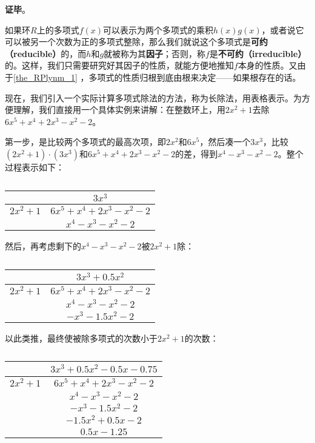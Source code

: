 \textbf{证毕}。

如果环$R$上的多项式$f(x)$可以表示为两个多项式的乘积$h(x)g(x)$，或者说它可以被另一个次数为正的多项式整除，那么我们就说这个多项式是\textbf{可约（reducible）}的，而$h$和$g$就被称为其\textbf{因子}；否则，称$f$是\textbf{不可约（irreducible）}的。这样，我们只需要研究好其因子的性质，就能方便地推知$f$本身的性质。又由于\autoref{the_RPlynm_1} ，多项式的性质归根到底由根来决定——如果根存在的话。

现在，我们引入一个实际计算多项式除法的方法，称为长除法，用表格表示。为方便理解，我们直接用一个具体实例来讲解：在整数环上，用$2x^2+1$去除$6x^5+x^4+2x^3-x^2-2$。

第一步，是比较两个多项式的最高次项，即$2x^2$和$6x^5$，然后凑一个$3x^3$，比较$(2x^2+1)\cdot(3x^3)$和$6x^5+x^4+2x^3-x^2-2$的差，得到$x^4-x^3-x^2-2$。整个过程表示如下：

\begin{table}[ht]
\centering
\caption{}\label{tab_RPlynm_1}
\begin{tabular}{|c|c|}
\hline
 & $3x^3$  \\
\hline
$2x^2+1$ & $6x^5+x^4+2x^3-x^2-2$ \\
\hline
& $x^4-x^3-x^2-2$\\

\hline
\end{tabular}
\end{table}

然后，再考虑剩下的$x^4-x^3-x^2-2$被$2x^2+1$除：

\begin{table}[ht]
\centering
\caption{}\label{tab_RPlynm_2}
\begin{tabular}{|c|c|}
\hline
 & $3x^3+0.5x^2$  \\
\hline
$2x^2+1$ & $6x^5+x^4+2x^3-x^2-2$ \\
\hline
& $x^4-x^3-x^2-2$ \\
\hline
& $-x^3-1.5x^2-2$ \\

\hline
\end{tabular}
\end{table}

以此类推，最终使被除多项式的次数小于$2x^2+1$的次数：

\begin{table}[ht]
\centering
\caption{}\label{tab_RPlynm_3}
\begin{tabular}{|c|c|}
\hline
 & $3x^3+0.5x^2-0.5x-0.75$  \\
\hline
$2x^2+1$ & $6x^5+x^4+2x^3-x^2-2$ \\
\hline
& $x^4-x^3-x^2-2$ \\
\hline
& $-x^3-1.5x^2-2$ \\
\hline
& $-1.5x^2+0.5x-2$ \\
\hline
& $0.5x-1.25$ \\
\hline
\end{tabular}
\end{table}

